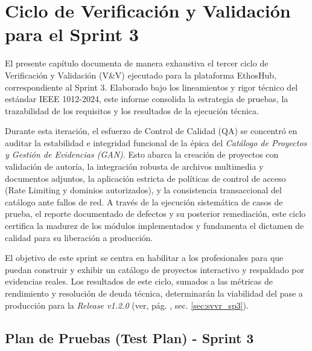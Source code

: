 
\chapter{Ciclo de Verificación y Validación para el Sprint 3}
\label{ch:sprint3}

El presente capítulo documenta de manera exhaustiva el tercer ciclo de Verificación y Validación (V\&V) ejecutado para la plataforma EthosHub, correspondiente al Sprint 3. Elaborado bajo los lineamientos y rigor técnico del estándar IEEE 1012-2024, este informe consolida la estrategia de pruebas, la trazabilidad de los requisitos y los resultados de la ejecución técnica. \par

Durante esta iteración, el esfuerzo de Control de Calidad (QA) se concentró en auditar la estabilidad e integridad funcional de la épica del \textit{Catálogo de Proyectos y Gestión de Evidencias (GAN)}. Esto abarca la creación de proyectos con validación de autoría, la integración robusta de archivos multimedia y documentos adjuntos, la aplicación estricta de políticas de control de acceso (Rate Limiting y dominios autorizados), y la consistencia transaccional del catálogo ante fallos de red. A través de la ejecución sistemática de casos de prueba, el reporte documentado de defectos y su posterior remediación, este ciclo certifica la madurez de los módulos implementados y fundamenta el dictamen de calidad para su liberación a producción.

\newpage
\begin{NotaTecnica}
El objetivo de este sprint se centra en habilitar a los profesionales para que puedan construir y exhibir un catálogo de proyectos interactivo y respaldado por evidencias reales. Los resultados de este ciclo, sumados a las métricas de rendimiento y resolución de deuda técnica, determinarán la viabilidad del pase a producción para la \textit{Release v1.2.0} (ver, pág. \pageref{sec:svvr_sp3}, sec. \ref{sec:svvr_sp3}).
\end{NotaTecnica}

\section{Plan de Pruebas (Test Plan) - Sprint 3}
\label{sec:plan_pruebas_sp3}

